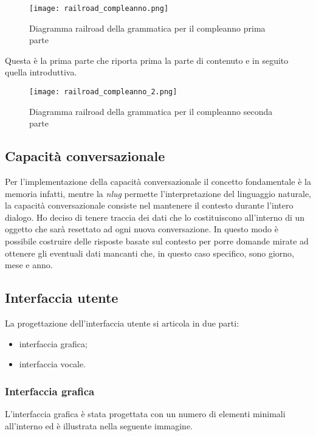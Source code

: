 	\begin{figure}[htbp]
		\begin{center}
			\texttt{[image: railroad\_compleanno.png]}
			\caption{Diagramma railroad della grammatica per il compleanno prima parte}
		\end{center}
	\end{figure}

	Questa è la prima parte che riporta prima la parte di contenuto e in seguito quella introduttiva.	
	\begin{figure}[htbp]
		\begin{center}
			\texttt{[image: railroad\_compleanno\_2.png]}
			\caption{Diagramma railroad della grammatica per il compleanno seconda parte}
		\end{center}
	\end{figure}

	\subsection{Capacità conversazionale}
	Per l'implementazione della capacità conversazionale il concetto fondamentale è la memoria infatti, mentre la \emph{\gls{nlug}} permette l'interpretazione del linguaggio naturale, la capacità conversazionale consiste nel mantenere il contesto durante l'intero dialogo. Ho deciso di tenere traccia dei dati che lo costituiscono all'interno di un oggetto che sarà resettato ad ogni nuova conversazione. In questo modo è possibile costruire delle risposte basate sul contesto per porre domande mirate ad ottenere gli eventuali dati mancanti che, in questo caso specifico, sono giorno, mese e anno.
	\subsection{Interfaccia utente}
	La progettazione dell'interfaccia utente si articola in due parti:
	\begin{itemize}
		\item interfaccia grafica;
		\item interfaccia vocale.
	\end{itemize}
		\subsubsection{Interfaccia grafica}
		L'interfaccia grafica è stata progettata con un numero di elementi minimali all'interno ed è illustrata nella seguente immagine.
		
